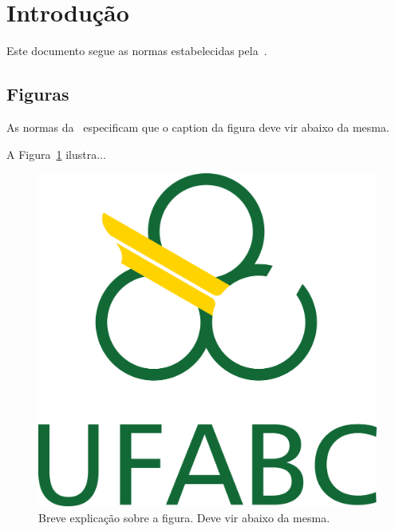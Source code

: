 
\chapter*[Introdução]{Introdução}

Este documento segue as normas estabelecidas pela~.

\section*{Figuras}\label{sec:figuras}

As normas da~ especificam que o caption da figura deve vir abaixo da mesma.

A Figura~\ref{fig:log} ilustra...

\begin{figure}[htpb]
   \centering
   \includegraphics[scale=.3]{figs/logo}
   \caption{Breve explicação sobre a figura. Deve vir abaixo da mesma.}
   \label{fig:log}
\end{figure}

